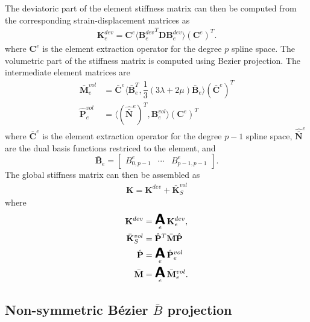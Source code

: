 \documentclass{article}
\DeclareMathOperator*{\A}{ \mathlarger{\mathlarger{\mathlarger{\boldsymbol{\mathsf{A}}}}} }
\newcommand{\Bezier}{{B\'{e}zier} }
\begin{document}
The deviatoric part of the element stiffness matrix can then be computed from the corresponding strain-displacement matrices as
\begin{align}
	\mathbf{K}_e^{dev}
    	=\mathbf{C}^e\langle {\mathbf{B}_{e}^{dev}}^T\mathbf{D}{\mathbf{B}}_{e}^{dev}\rangle (\mathbf{C}^e)^T.
\end{align}
where $\mathbf{C}^e$ is the element extraction operator for the degree $p$ spline space. The volumetric part of the stiffness matrix is computed using Bezier projection. The intermediate element matrices are
\begin{align}
\bar{\mathbf{M}}^{vol}_e&=\bar{\mathbf{C}}^e\langle{\bar{\mathbf{B}}_e^T,\dfrac{1}{3}(3\lambda+2\mu)\bar{\mathbf{B}}_e}\rangle(\bar{\mathbf{C}}^e)^T\\
\hat{\mathbf{P}}^{vol}_e&=\langle{(\hat{\bar{\mathbf{N}}}^e)^T, \mathbf{B}_e^{vol}}\rangle(\mathbf{C}^e)^T
\end{align}
where $\bar{\mathbf{C}}^e$ is the element extraction operator for the degree $p-1$ spline space, $\hat{\bar{\mathbf{N}}}^e$ are the dual basis functions restriced to the element, and \begin{equation}
\bar{\mathbf{B}}_e=
\begin{bmatrix}
{B}^e_{0,p-1} & \cdots & {B}^e_{p-1,p-1}
\end{bmatrix}.
\end{equation}The global stiffness matrix can then be assembled as
\begin{align}
	\mathbf{K} = \mathbf{K}^{dev} + \bar{\mathbf{K}}^{vol}_{S}
\end{align}
where
\begin{align}
	\mathbf{K}^{dev} &=\A_e\mathbf{K}_e^{dev}, \\
	\bar{\mathbf{K}}_S^{vol}&=\hat{\mathbf{P}}^T\bar{\mathbf{M}}\hat{\mathbf{P}} \\
	\hat{\mathbf{P}} &=\A_e\hat{{\mathbf{P}}}^{vol}_e \\
    \bar{\mathbf{M}} &=\A_e\bar{\mathbf{M}}^{vol}_e.
\end{align}
\subsection{Non-symmetric \Bezier $\bar{B}$ projection}
\end{document}
